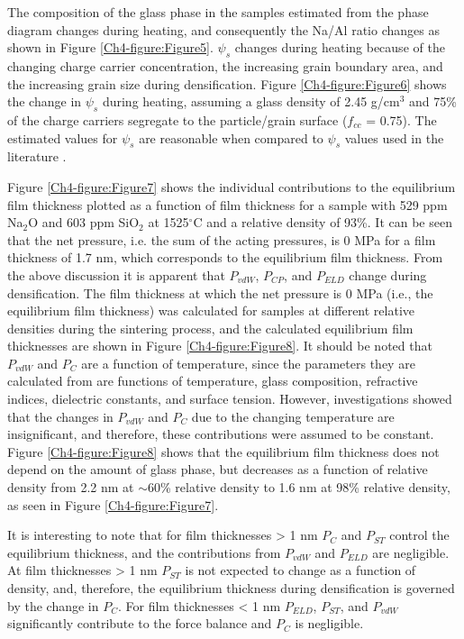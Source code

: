 The composition of the glass phase in the samples estimated from the phase diagram changes during heating, and consequently the Na/Al ratio changes as shown in Figure \ref{Ch4-figure:Figure5}. $\psi_{s}$ changes during heating because of the changing charge carrier concentration, the increasing grain boundary area, and the increasing grain size during densification. Figure \ref{Ch4-figure:Figure6} shows the change in $\psi_{s}$ during heating, assuming a glass density of 2.45 g/cm$^{3}$ and 75\% of the charge carriers segregate to the particle/grain surface ($f_{cc}$ = 0.75). The estimated values for $\psi_{s}$ are reasonable when compared to $\psi_{s}$ values used in the literature \cite{Clarke1993}.

Figure \ref{Ch4-figure:Figure7} shows the individual contributions to the equilibrium film thickness plotted as a function of film thickness for a sample with 529 ppm Na$_{2}$O and 603 ppm SiO$_{2}$ at 1525$^{\circ}$C and a relative density of 93\%. It can be seen that the net pressure, i.e. the sum of the acting pressures, is 0 MPa for a film thickness of 1.7 nm, which corresponds to the equilibrium film thickness. From the above discussion it is apparent that $P_{vdW}$, $P_{CP}$, and $P_{ELD}$ change during densification. The film thickness at which the net pressure is 0 MPa (i.e., the equilibrium film thickness) was calculated for samples at different relative densities during the sintering process, and the calculated equilibrium film thicknesses are shown in Figure \ref{Ch4-figure:Figure8}. It should be noted that $P_{vdW}$ and $P_{C}$ are a function of temperature, since the parameters they are calculated from are functions of temperature, glass composition, refractive indices, dielectric constants, and surface tension. However, investigations showed that the changes in $P_{vdW}$ and $P_{C}$ due to the changing temperature are insignificant, and therefore, these contributions were assumed to be constant. Figure \ref{Ch4-figure:Figure8} shows that the equilibrium film thickness does not depend on the amount of glass phase, but decreases as a function of relative density from 2.2 nm at $\sim$60\% relative density to 1.6 nm at 98\% relative density, as seen in Figure \ref{Ch4-figure:Figure7}. 

It is interesting to note that for film thicknesses > 1 nm $P_{C}$ and $P_{ST}$ control the equilibrium thickness, and the contributions from $P_{vdW}$ and $P_{ELD}$ are negligible. At film thicknesses > 1 nm $P_{ST}$ is not expected to change as a function of density, and, therefore, the equilibrium thickness during densification is governed by the change in $P_{C}$. For film thicknesses < 1 nm $P_{ELD}$, $P_{ST}$, and $P_{vdW}$ significantly contribute to the force balance and $P_{C}$ is negligible.


